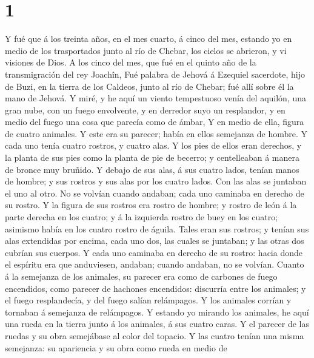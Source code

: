 \hypertarget{section}{%
\section{1}\label{section}}

 Y fué que á los treinta años, en el mes cuarto, á cinco
del mes, estando yo en medio de los trasportados junto al río de Chebar,
los cielos se abrieron, y vi visiones de Dios.  A los
cinco del mes, que fué en el quinto año de la transmigración del rey
Joachîn,  Fué palabra de Jehová á Ezequiel sacerdote, hijo
de Buzi, en la tierra de los Caldeos, junto al río de Chebar; fué allí
sobre él la mano de Jehová.  Y miré, y he aquí un viento
tempestuoso venía del aquilón, una gran nube, con un fuego envolvente, y
en derredor suyo un resplandor, y en medio del fuego una cosa que
parecía como de ámbar,  Y en medio de ella, figura de
cuatro animales. Y este era su parecer; había en ellos semejanza de
hombre.  Y cada uno tenía cuatro rostros, y cuatro alas.
 Y los pies de ellos eran derechos, y la planta de sus
pies como la planta de pie de becerro; y centelleaban á manera de bronce
muy bruñido.  Y debajo de sus alas, á sus cuatro lados,
tenían manos de hombre; y sus rostros y sus alas por los cuatro lados.
 Con las alas se juntaban el uno al otro. No se volvían
cuando andaban; cada uno caminaba en derecho de su rostro.
 Y la figura de sus rostros era rostro de hombre; y
rostro de león á la parte derecha en los cuatro; y á la izquierda rostro
de buey en los cuatro; asimismo había en los cuatro rostro de águila.
 Tales eran sus rostros; y tenían sus alas extendidas por
encima, cada uno dos, las cuales se juntaban; y las otras dos cubrían
sus cuerpos.  Y cada uno caminaba en derecho de su
rostro: hacia donde el espíritu era que anduviesen, andaban; cuando
andaban, no se volvían.  Cuanto á la semejanza de los
animales, su parecer era como de carbones de fuego encendidos, como
parecer de hachones encendidos: discurría entre los animales; y el fuego
resplandecía, y del fuego salían relámpagos.  Y los
animales corrían y tornaban á semejanza de relámpagos.  Y
estando yo mirando los animales, he aquí una rueda en la tierra junto á
los animales, á sus cuatro caras.  Y el parecer de las
ruedas y su obra semejábase al color del topacio. Y las cuatro tenían
una misma semejanza: su apariencia y su obra como rueda en medio de
